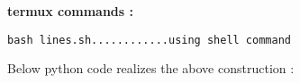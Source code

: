 \documentclass[10pt, a4paper]{article}
\begin{document}
\textbf{termux commands :}
\begin{lstlisting}
bash lines.sh............using shell command
\end{lstlisting}
\begin{center}
Below python code realizes the above construction :
\end{center}
\end{document}
